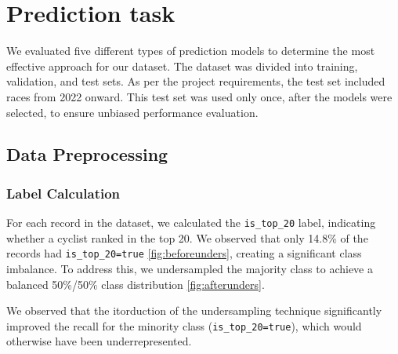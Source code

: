 \documentclass{article}
\begin{document}
\section{Prediction task}

We evaluated five different types of prediction models to determine the most effective approach for our dataset. The dataset was divided into training, validation, and test sets. As per the project requirements, the test set included races from 2022 onward. This test set was used only once, after the models were selected, to ensure unbiased performance evaluation.

\subsection{Data Preprocessing}
\subsubsection{Label Calculation}
For each record in the dataset, we calculated the \texttt{is\_top\_20} label, indicating whether a cyclist ranked in the top 20. We observed that only 14.8\% of the records had \texttt{is\_top\_20=true} \ref{fig:beforeunders}, creating a significant class imbalance. To address this, we undersampled the majority class to achieve a balanced 50\%/50\% class distribution \ref{fig:afterunders}.

We observed that the itorduction of the undersampling technique significantly improved the recall for the minority class (\texttt{is\_top\_20=true}), which would otherwise have been underrepresented.
\end{document}
